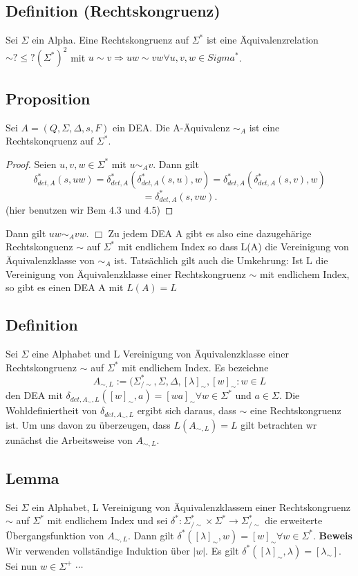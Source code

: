 \documentclass[a4paper,11pt]{article}
\begin{document}
\subsection{Definition (Rechtskongruenz)} Sei $\Sigma$ ein Alpha. Eine Rechtskongruenz auf $\Sigma^{*}$ ist eine Äquivalenzrelation $\sim ?\leq ?(\Sigma^{*})^{2}$ mit $u \sim v \Rightarrow uw \sim vw \forall u, v, w \in Sigma^{*}$.

\subsection{Proposition} Sei $A = (Q, \Sigma, \Delta, s, F)$ ein DEA. Die A-Äquivalenz $\sim_{A}$ ist eine Rechtskonqruenz auf $\Sigma^{*}$.\\
\begin{proof}
  Seien $u, v, w \in \Sigma^{*}$ mit $u \sim_{A} v$. Dann gilt 
  \[\delta_{det, A}^{*}(s, uw) = \delta_{det,A}^{*}(\delta_{det,A}^{*}(s, u), w) = \delta_{det,A}^{*}(\delta_{det,A}^{*}(s,v), w)\]
  \[= \delta_{det,A}^{*}(s, vw).\] (hier benutzen wir Bem 4.3 und 4.5)    
\end{proof} Dann gilt $uw\sim_{A}vw.$
$\Box $
Zu jedem DEA A gibt es also eine dazugehärige Rechtskonguenz $\sim$ auf $\Sigma^{*}$ mit endlichem Index so dass L(A) die Vereinigung von Äquivalenzklasse von $\sim_{A}$ ist. Tatsächlich gilt auch die Umkehrung: Ist L die Vereinigung von Äquivalenzklasse einer Rechtskongruenz $\sim$ mit endlichem Index, so gibt es einen DEA A mit $L(A) = L$

\subsection{Definition} Sei $\Sigma$ eine Alphabet und L Vereinigung von Äquivalenzklasse einer Rechtskongruenz $\sim$ auf $\Sigma^{*}$ mit endlichem Index. Es bezeichne
\[A_{\sim , L} := (\Sigma^{*}_{/\sim}, \Sigma, \Delta, [\lambda]_{\sim}, {[w]_{\sim} : w \in L}\]
den DEA mit $\delta_{det, A_{\sim}, L}([w]_{\sim}, a) = [wa]_{\sim} \forall w \in \Sigma^{*}$ und $a \in \Sigma$. Die Wohldefiniertheit von $\delta_{det, A_{\sim}, L}$ ergibt sich daraus, dass $\sim$ eine Rechtskongruenz ist. Um uns davon zu überzeugen, dass $L(A_{\sim, L}) = L$ gilt betrachten wr zunächst die Arbeitsweise von $A_{\sim, L}$.

\subsection{Lemma} Sei $\Sigma$ ein Alphabet, L Vereinigung von Äquivalenzklassem einer Rechtskongruenz $\sim$ auf $\Sigma^{*}$ mit endlichem Index und sei $\delta^{*} : \Sigma^{*}_{/\sim} \times \Sigma^{*} \rightarrow \Sigma^{*}_{/\sim}$ die erweiterte Übergangsfunktion von $A_{\sim, L}$. Dann gilt $\delta^{*}([\lambda]_{\sim}, w) = [w]_{\sim} \forall w \in \Sigma^{*}$. \textbf{Beweis} Wir verwenden vollständige Induktion über $|w|$. Es gilt $\delta^{*}([\lambda]_{\sim}, \lambda) = [\lambda_{\sim}]$. Sei nun $w \in \Sigma^{+}$ $\cdots$
\end{document}
